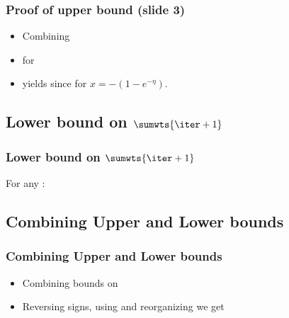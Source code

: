 \documentclass[handout]{beamer}
\begin{document}
\begin{frame}
\frametitle{Proof of upper bound (slide 3)}
\begin{itemize}
\item Combining 
\item
for  
\item yields
since  for $x = -(1-e^{-\eta})$.
\end{itemize}
\end{frame}

\subsection{Lower bound on $\sumwts{\iter+1}$}

\begin{frame}
\frametitle{Lower bound on $\sumwts{\iter+1}$}

For any :
\R{\[
\sumwts{\iter+1} \geq \wt{\iter+1}{j} = \wt{1}{j} e^{-\eta \lossi{j}}
\]}

\end{frame}

\subsection{Combining Upper and Lower bounds}

\begin{frame}
\frametitle{Combining Upper and Lower bounds}
\begin{itemize}
\item
Combining bounds on 
\R{\[
 \ln \wt{1}{j} -\eta \lossi{j} \leq \ln \sumwts{\iter+1} 
 \leq -(1-e^{-\eta}) \sum_{t=1}^T \distvec{t}\cdot\costvec{t}
\]}
\item
Reversing signs, using  
and reorganizing we get
\end{itemize}
\end{frame}
\end{document}
